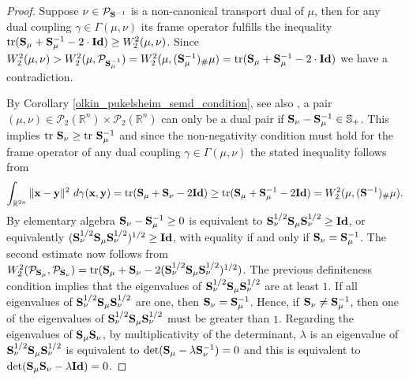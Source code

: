 \documentclass{amsart}
\numberwithin{equation}{section}
\newcommand\cP{{\mathcal P}}
\newcommand\bS{{\bf S}}
\newcommand\R{{\mathbb R}}
\newcommand\id{{\operatorname{\bf Id}}}
\newcommand\tr{{\operatorname{tr}}}
\theoremstyle{plain}
\theoremstyle{definition}
\begin{document}
\begin{proof}
Suppose $\nu \in  \cP_{\bS^{-1}}$ is a non-canonical transport dual of $\mu$, then for any dual coupling $\gamma \in \Gamma(\mu,\nu)$ 
its frame operator fulfills the inequality $\tr(\bS_{\mu}+\bS^{-1}_{\mu}-2\cdot \id) \geq W^2_2(\mu, \nu)$. Since $W^2_2(\mu, \nu)> W^2_2(\mu, \cP_{\bS^{-1}_{\mu}}) = W^2_2(\mu, (\bS^{-1}_{\mu})_{\#}\mu)=\tr(\bS_{\mu}+\bS^{-1}_{\mu}-2\cdot \id)$ we have a contradiction.   

By Corollary \ref{olkin_pukelsheim_semd_condition}, see also \cite[Lemma 1]{olkin1982distance}, a pair $(\mu, \nu) \in \cP_2(\mathbb{R}^n) \times \cP_2(\mathbb{R}^n)$ can only be a dual pair if $\bS_{\nu}-\bS^{-1}_{\mu} \in \mathbb{S}_+$. This implies $\tr \ \bS_{\nu}\geq \tr\ \bS^{-1}_{\mu}$ and since the non-negativity condition must hold 
for the frame operator of any dual coupling $\gamma \in \Gamma(\mu,\nu)$ the stated inequality follows from 
\[ \int_{\R^{2n}}\| {\bf x} -{\bf y} \|^2\ d\gamma({\bf x}, {\bf y} ) = \tr (\bS_{\mu}+\bS_{\nu}-2 \id) \geq \tr (\bS_{\mu}+\bS^{-1}_{\mu}-2 \id)= W^2_2(\mu,(\bS^{-1})_{\#}\mu).\]
By elementary algebra $\bS_{\nu}-\bS^{-1}_{\mu} \geq 0$ is equivalent to $\bS^{1/2}_{\nu}\bS_{\mu} \bS^{1/2}_{\nu} \geq \id$, or equivalently $(\bS^{1/2}_{\nu}\bS_{\mu} \bS^{1/2}_{\nu})^{1/2} \geq \id$, with equality if and only if $\bS_{\nu}=\bS^{-1}_{\mu}$. The second estimate now follows 
from $W^2_2(\cP_{\bS_{\mu}}, \cP_{\bS_{\nu}})=\tr(\bS_{\mu}+\bS_{\nu}- 2 (\bS^{1/2}_{\nu}\bS_{\mu} \bS^{1/2}_{\nu})^{1/2} )$. 
The previous definiteness condition implies that the eigenvalues of $\bS^{1/2}_{\nu}\bS_{\mu} \bS^{1/2}_{\nu}$ are at least $1$. 
If all eigenvalues of $\bS^{1/2}_{\nu}\bS_{\mu} \bS^{1/2}_{\nu}$ are one, then $\bS_{\nu} = \bS^{-1}_{\mu}$. Hence, if $\bS_{\nu} \neq \bS^{-1}_{\mu}$, then one of the eigenvalues of $\bS^{1/2}_{\nu}\bS_{\mu} \bS^{1/2}_{\nu}$ must be greater than $1$.  
Regarding the eigenvalues of $\bS_{\mu}\bS_{\nu}$, by multiplicativity of the determinant, $\lambda$ is an eigenvalue of $\bS^{1/2}_{\nu}\bS_{\mu} \bS^{1/2}_{\nu}$ is equivalent to $\det(\bS_{\mu} -\lambda \bS^{-1}_{\nu})=0$ and this is equivalent to $\det(\bS_{\mu}\bS_{\nu} -\lambda \id)=0$. 
\end{proof}
\end{document}
